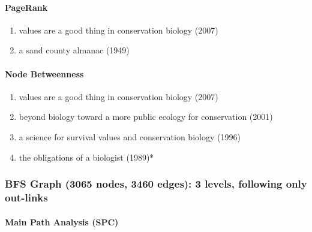 \documentclass[lettepaper,]{article}
\providecommand{\tightlist}{%
  \setlength{\itemsep}{0pt}\setlength{\parskip}{0pt}}
\let\oldparagraph\paragraph
\renewcommand{\paragraph}[1]{\oldparagraph{#1}\mbox{}}
\begin{document}
\hypertarget{pagerank-8}{%
\paragraph{PageRank}\label{pagerank-8}}

\begin{enumerate}
\def\labelenumi{\arabic{enumi}.}
\tightlist
\item
  values are a good thing in conservation biology (2007)
\item
  a sand county almanac (1949)
\end{enumerate}

\hypertarget{node-betweenness-5}{%
\paragraph{Node Betweenness}\label{node-betweenness-5}}

\begin{enumerate}
\def\labelenumi{\arabic{enumi}.}
\tightlist
\item
  values are a good thing in conservation biology (2007)
\item
  beyond biology toward a more public ecology for conservation (2001)
\item
  a science for survival values and conservation biology (1996)
\item
  the obligations of a biologist (1989)*
\end{enumerate}

\hypertarget{bfs-graph-3065-nodes-3460-edges-3-levels-following-only-out-links}{%
\subsubsection{BFS Graph (3065 nodes, 3460 edges): 3 levels, following
only
out-links}\label{bfs-graph-3065-nodes-3460-edges-3-levels-following-only-out-links}}

\hypertarget{main-path-analysis-spc-6}{%
\paragraph{Main Path Analysis (SPC)}\label{main-path-analysis-spc-6}}
\end{document}
